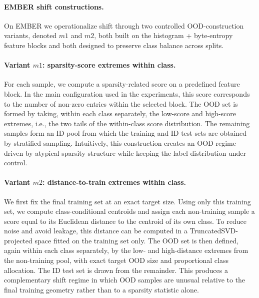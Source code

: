 \documentclass[journal]{IEEEtran}
\begin{document}
\paragraph{EMBER shift constructions.}
On EMBER we operationalize shift through two controlled OOD-construction variants, denoted $m1$ and $m2$, both built on the histogram + byte-entropy feature blocks and both designed to preserve class balance across splits.

\paragraph{Variant $m1$: sparsity-score extremes within class.}
For each sample, we compute a sparsity-related score on a predefined feature block. In the main configuration used in the experiments, this score corresponds to the number of non-zero entries within the selected block. The OOD set is formed by taking, within each class separately, the low-score and high-score extremes, i.e., the two tails of the within-class score distribution. The remaining samples form an ID pool from which the training and ID test sets are obtained by stratified sampling. Intuitively, this construction creates an OOD regime driven by atypical sparsity structure while keeping the label distribution under control.

\paragraph{Variant $m2$: distance-to-train extremes within class.}
We first fix the final training set at an exact target size. Using only this training set, we compute class-conditional centroids and assign each non-training sample a score equal to its Euclidean distance to the centroid of its own class. To reduce noise and avoid leakage, this distance can be computed in a TruncatedSVD-projected space fitted on the training set only. The OOD set is then defined, again within each class separately, by the low- and high-distance extremes from the non-training pool, with exact target OOD size and proportional class allocation. The ID test set is drawn from the remainder. This produces a complementary shift regime in which OOD samples are unusual relative to the final training geometry rather than to a sparsity statistic alone.
\end{document}
